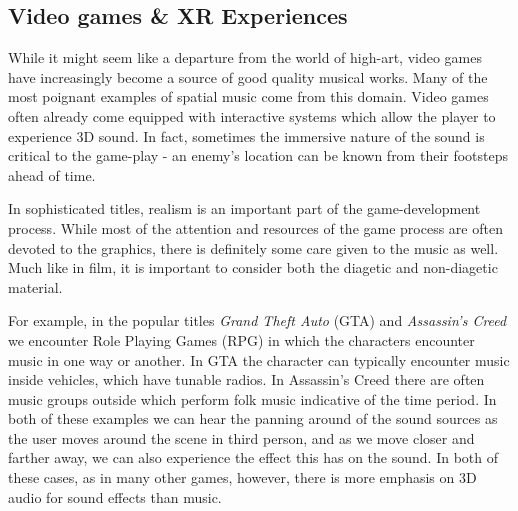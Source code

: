 
\subsection{Video games \& XR Experiences}


While it might seem like a departure from the world of high-art, video games have increasingly become a source of good quality musical works. Many of the most poignant examples of spatial music come from this domain. Video games often already come equipped with interactive systems which allow the player to experience 3D sound. In fact, sometimes the immersive nature of the sound is critical to the game-play - an enemy's location can be known from their footsteps ahead of time. 

In sophisticated titles, realism is an important part of the game-development process. While most of the attention and resources of the game process are often devoted to the graphics, there is definitely some care given to the music as well. Much like in film, it is important to consider both the diagetic and non-diagetic material. 

For example, in the popular titles \textit{Grand Theft Auto} (GTA) and \textit{Assassin's Creed} we encounter Role Playing Games (RPG) in which the characters encounter music in one way or another. In GTA the character can typically encounter music inside vehicles, which have tunable radios. In Assassin's Creed there are often music groups outside which perform folk music indicative of the time period. In both of these examples we can hear the panning around of the sound sources as the user moves around the scene in third person, and as we move closer and farther away, we can also experience the effect this has on the sound. In both of these cases, as in many other games, however, there is more emphasis on 3D audio for sound effects than music. 

